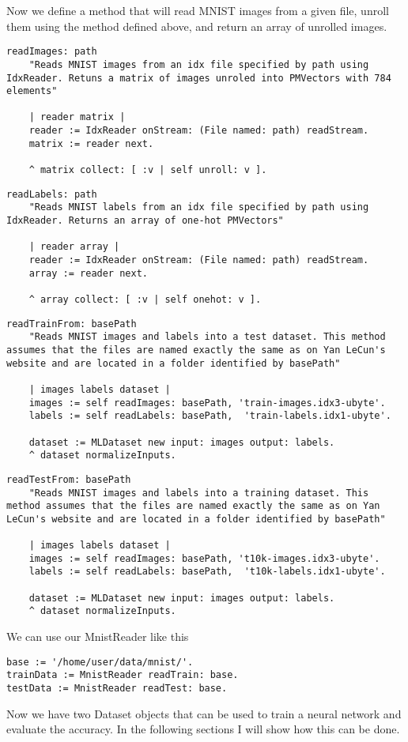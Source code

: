 Now we define a method that will read MNIST images from a given file, unroll them using the method defined above, and return an array of unrolled images.

\begin{lstlisting}
readImages: path
	"Reads MNIST images from an idx file specified by path using IdxReader. Retuns a matrix of images unroled into PMVectors with 784 elements"

	| reader matrix |
	reader := IdxReader onStream: (File named: path) readStream.
	matrix := reader next.
	
	^ matrix collect: [ :v | self unroll: v ].
\end{lstlisting}

\begin{lstlisting}
readLabels: path
	"Reads MNIST labels from an idx file specified by path using IdxReader. Returns an array of one-hot PMVectors"

	| reader array |
	reader := IdxReader onStream: (File named: path) readStream.
	array := reader next.
	
	^ array collect: [ :v | self onehot: v ].
\end{lstlisting}

\begin{lstlisting}
readTrainFrom: basePath
	"Reads MNIST images and labels into a test dataset. This method assumes that the files are named exactly the same as on Yan LeCun's website and are located in a folder identified by basePath"

	| images labels dataset |
	images := self readImages: basePath, 'train-images.idx3-ubyte'.
	labels := self readLabels: basePath,  'train-labels.idx1-ubyte'.
	
	dataset := MLDataset new input: images output: labels.
	^ dataset normalizeInputs.
\end{lstlisting}

\begin{lstlisting}
readTestFrom: basePath
	"Reads MNIST images and labels into a training dataset. This method assumes that the files are named exactly the same as on Yan LeCun's website and are located in a folder identified by basePath"

	| images labels dataset |
	images := self readImages: basePath, 't10k-images.idx3-ubyte'.
	labels := self readLabels: basePath,  't10k-labels.idx1-ubyte'.
	
	dataset := MLDataset new input: images output: labels.
	^ dataset normalizeInputs.
\end{lstlisting}

We can use our MnistReader like this

\begin{lstlisting}
base := '/home/user/data/mnist/'.
trainData := MnistReader readTrain: base.
testData := MnistReader readTest: base.
\end{lstlisting}

Now we have two Dataset objects that can be used to train a neural network and evaluate the accuracy. In the following sections I will show how this can be done.
